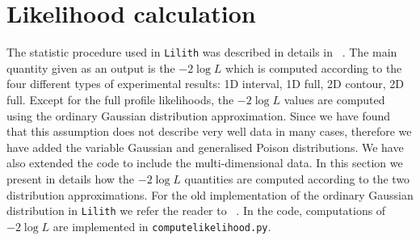 \clearpage
\section{Likelihood calculation} \label{sec:likelihood}
\newcommand{\lilith}{{\tt Lilith} }
\newcommand{\logL}{{ -2\log L } }
\newcommand{\XML}{ {\tt XML}}
\newcommand{\beq}{\begin{eqnarray}} 
\newcommand{\eeq}{\end{eqnarray}} 

\newcommand{\be}{\begin{equation}} 
\newcommand{\ee}{\end{equation}} 

\newcommand{\bpmatrix}{\begin{pmatrix}}
\newcommand{\epmatrix}{\end{pmatrix}}
\newcommand{\ba}{\begin{array}}
\newcommand{\ea}{\end{array}}
\newcommand{\braket}[1]{\left(#1\right)}
\newcommand{\sbraket}[1]{\left[#1\right]}
\newcommand{\bmu}{\bm{\mu}}
\newcommand{\hbmu}{\hat{\bm{\mu}}}
\newcommand{\nhung}{\color{blue}}

The statistic procedure used in \lilith was described in details in ~\cite{Bernon:2015hsa}. 
The main quantity given as an output 
is the  $\logL$ which is computed according to the four different types of experimental results: 1D interval, 1D full,
2D contour, 2D full. Except for the full profile likelihoods, the $\logL$ values are computed using the ordinary Gaussian
distribution approximation. Since we have found that this assumption does not describe very well data in many cases, therefore
 we have added the  variable Gaussian and generalised Poison distributions. We have also extended the code to include the multi-dimensional data. In this section we present in details
how the  $\logL$ quantities are computed according to the two distribution approximations. For the old implementation of the  ordinary Gaussian distribution in \lilith
we refer the reader to ~\cite{Bernon:2015hsa}.
In the code, computations of $\logL$  are implemented in {\tt computelikelihood.py}.

